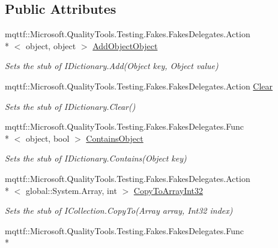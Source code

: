 \subsection*{Public Attributes}
\begin{DoxyCompactItemize}
\item 
mqttf\-::\-Microsoft.\-Quality\-Tools.\-Testing.\-Fakes.\-Fakes\-Delegates.\-Action\\*
$<$ object, object $>$ \hyperlink{class_system_1_1_collections_1_1_fakes_1_1_stub_i_dictionary_ae26c41b617b447739758f02ee2ef9220}{Add\-Object\-Object}
\begin{DoxyCompactList}\small\item\em Sets the stub of I\-Dictionary.\-Add(\-Object key, Object value)\end{DoxyCompactList}\item 
mqttf\-::\-Microsoft.\-Quality\-Tools.\-Testing.\-Fakes.\-Fakes\-Delegates.\-Action \hyperlink{class_system_1_1_collections_1_1_fakes_1_1_stub_i_dictionary_a55be8c5e7f6ed067ba75841274538efc}{Clear}
\begin{DoxyCompactList}\small\item\em Sets the stub of I\-Dictionary.\-Clear()\end{DoxyCompactList}\item 
mqttf\-::\-Microsoft.\-Quality\-Tools.\-Testing.\-Fakes.\-Fakes\-Delegates.\-Func\\*
$<$ object, bool $>$ \hyperlink{class_system_1_1_collections_1_1_fakes_1_1_stub_i_dictionary_a97ae730845cccb8b587c4a94dbf73c6f}{Contains\-Object}
\begin{DoxyCompactList}\small\item\em Sets the stub of I\-Dictionary.\-Contains(\-Object key)\end{DoxyCompactList}\item 
mqttf\-::\-Microsoft.\-Quality\-Tools.\-Testing.\-Fakes.\-Fakes\-Delegates.\-Action\\*
$<$ global\-::\-System.\-Array, int $>$ \hyperlink{class_system_1_1_collections_1_1_fakes_1_1_stub_i_dictionary_af6bf71bf75ed1c831a0d80ec9841273f}{Copy\-To\-Array\-Int32}
\begin{DoxyCompactList}\small\item\em Sets the stub of I\-Collection.\-Copy\-To(\-Array array, Int32 index)\end{DoxyCompactList}\item 
mqttf\-::\-Microsoft.\-Quality\-Tools.\-Testing.\-Fakes.\-Fakes\-Delegates.\-Func\\*

\end{DoxyCompactItemize}
